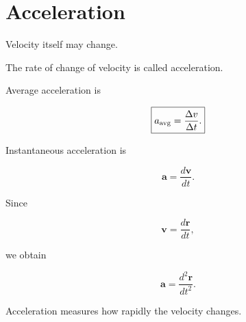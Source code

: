 \section{Acceleration}

Velocity itself may change.

The rate of change of velocity is called acceleration.

Average acceleration is

\[
\boxed{
	a_{\rm avg}
	=
	\frac{\Delta v}{\Delta t}.
}
\]

Instantaneous acceleration is

\[
\boxed{
	\mathbf a
	=
	\frac{d\mathbf v}{dt}.
}
\]

Since

\[
\mathbf v
=
\frac{d\mathbf r}{dt},
\]

we obtain

\[
\boxed{
	\mathbf a
	=
	\frac{d^2\mathbf r}{dt^2}.
}
\]

Acceleration measures how rapidly the velocity changes.

